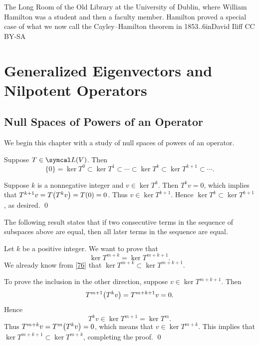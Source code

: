 %
{The Long Room of the Old Library at the University of Dublin, where William Hamilton  was a student and then a faculty member. Hamilton proved a special case of what we now call the Cayley--Hamilton theorem in 1853.}{.6in}{David Iliff CC BY-SA}


\section{Generalized Eigenvectors and Nilpotent Operators} \label{geneig}

\subsection{Null Spaces of Powers of an Operator}

We begin this chapter with a  study of null spaces of powers of an operator.

{Suppose $T \in \L(V)$. Then
\[
\{0\} = \ker T^0 \subset \ker T^1 \subset \cdots
\subset \ker T^k \subset \ker T^{k+1} \subset \dotsb .
\]
}

\proof
Suppose $k$ is a nonnegative integer and $v \in \ker T^k\!$. Then $T^k v = 0$, which implies that $T^{k+1} v = T\paren[\big]{T^kv} = T(0) = 0$. Thus $v \in \ker T^{k+1}\!$. Hence \mbox{$\ker T^k \subset \ker T^{k+1}\!$}, as desired. \qed


The following result states that if two consecutive terms in the sequence of subspaces above are equal, then all later terms in the sequence are equal.


\proof
Let $k$ be a positive integer.  We want to prove
that
\[
\ker T^{m+k} = \ker T^{m + k + 1}\!.
\]
We already know from \ref{76} that $\ker T^{m+k} \subset \ker T^{m + k + 1}\!$.

To prove the inclusion in the other direction, suppose $v \in \ker T^{m+ k+1}\!$.  Then
\[
T^{m+1} \paren[\big]{T^k v} = T^{m+k+1}v =0.
\]
Hence
\[
T^k v \in \ker T^{m+1} = \ker T^m\!.
\]
Thus $T^{m+k} v = T^m\paren[\big]{T^k v} = 0$, which means that $v \in \ker T^{m+k}\!$.  This
implies that $\ker T^{m + k+1} \subset \ker T^{m+k}\!$, completing the proof.
\qed

